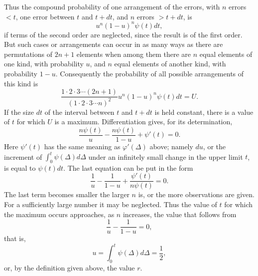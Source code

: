 \documentclass[11pt]{article}
\begin{document}
Thus the compound probability of one arrangement of the errors, with $n$ errors $<t$, one error between $t$ and $t+dt$, and $n$ errors $>t+dt$, is
\[
 u^n(1-u)^n\psi(t)dt,
\]
if terms of the second order are neglected, since the result is of the first order. But such cases or arrangements can occur in as many ways as there are permutations of $2n+1$ elements when among them there are $n$ equal elements of one kind, with probability $u$, and $n$ equal elements of another kind, with probability $1-u$. Consequently the probability of all possible arrangements of this kind is
\[
 \frac{1\cdot2\cdot3\cdots(2n+1)}{(1\cdot2\cdot3\cdots n)^2}u^n(1-u)^n\psi(t)dt=U.
\]
If the size $dt$ of the interval between $t$ and $t+dt$ is held constant, there is a value of $t$ for which $U$ is a maximum. Differentiation gives, for its determination,
\[
 \frac{n\psi(t)}{u}-\frac{n\psi(t)}{1-u}+\psi'(t)=0.
\]
Here $\psi'(t)$ has the same meaning as $\varphi'(\Delta)$ above; namely $du$, or the increment of $\int_0^t\psi(\Delta)d\Delta$ under an infinitely small change in the upper limit $t$, is equal to $\psi(t)dt$. The last equation can be put in the form
\[
 \frac1u-\frac1{1-u}+\frac{\psi'(t)}{n\psi(t)}=0.
\]
The last term becomes smaller the larger $n$ is, or the more observations are given. For a sufficiently large number it may be neglected. Thus the value of $t$ for which the maximum occurs approaches, as $n$ increases, the value that follows from
\[
 \frac1u-\frac1{1-u}=0,
\]
that is,
\[
 u=\int_0^t\psi(\Delta)d\Delta=\frac12,
\]
or, by the definition given above, the value $r$.
\end{document}
